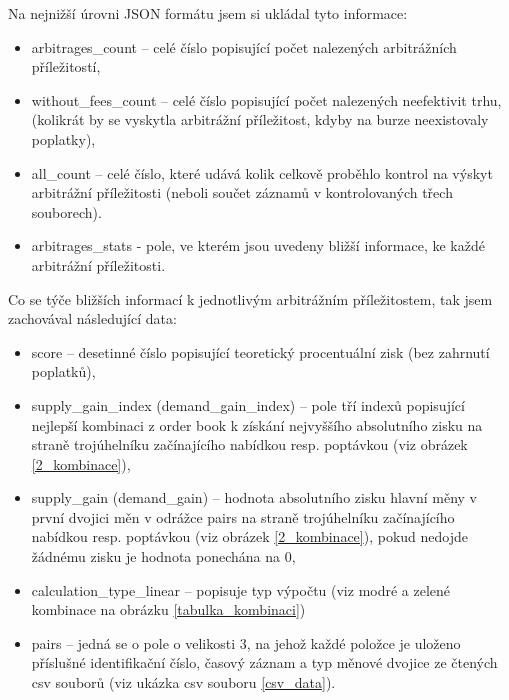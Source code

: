 \documentclass[thesis=B,czech]{FITthesis}[2019/03/21]
\begin{document}
Na nejnižší úrovni JSON formátu jsem si ukládal tyto informace:
\begin{itemize}
    \item arbitrages\_count -- celé číslo popisující počet nalezených arbitrážních příležitostí,
    \item without\_fees\_count -- celé číslo popisující počet nalezených neefektivit trhu, (kolikrát by se vyskytla arbitrážní příležitost, kdyby na burze neexistovaly poplatky), 
    \item all\_count -- celé číslo, které udává kolik celkově proběhlo kontrol na výskyt arbitrážní příležitosti (neboli součet záznamů v kontrolovaných třech souborech).
    \item arbitrages\_stats - pole, ve kterém jsou uvedeny bližší informace, ke každé arbitrážní příležitosti. 
\end{itemize}
Co se týče bližších informací k jednotlivým arbitrážním příležitostem, tak jsem zachovával následující data:
\begin{itemize}
    \item score -- desetinné číslo popisující teoretický procentuální zisk (bez zahrnutí poplatků),
    \item supply\_gain\_index (demand\_gain\_index) -- pole tří indexů popisující nejlepší kombinaci z order book k získání nejvyššího absolutního zisku na straně trojúhelníku začínajícího nabídkou resp. poptávkou (viz obrázek \ref{2_kombinace}),
    \item supply\_gain (demand\_gain) -- hodnota absolutního zisku hlavní měny v první dvojici měn v odrážce pairs na straně trojúhelníku začínajícího nabídkou resp. poptávkou (viz obrázek \ref{2_kombinace}), pokud nedojde žádnému zisku je hodnota ponechána na 0,
    \item calculation\_type\_linear -- popisuje typ výpočtu (viz modré a zelené kombinace na obrázku \ref{tabulka_kombinaci})
    \item pairs -- jedná se o pole o velikosti 3, na jehož každé položce je uloženo příslušné identifikační číslo, časový záznam a typ měnové dvojice ze čtených csv souborů (viz ukázka csv souboru \ref{csv_data}).
\end{itemize}
\end{document}
